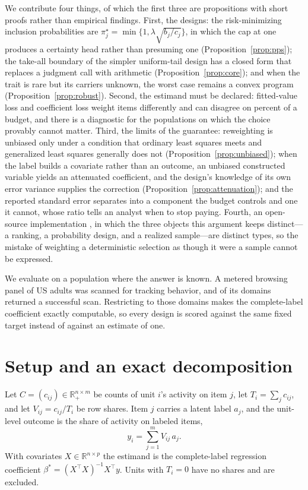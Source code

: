 \documentclass[11pt]{article}
\theoremstyle{plain}
\theoremstyle{remark}
\begin{document}
We contribute four things, of which the first three are propositions with short proofs rather than empirical findings. First, the designs: the risk-minimizing inclusion probabilities are $\pi_j^\star=\min\{1,\lambda\sqrt{b_j/c_j}\}$, in which the cap at one produces a certainty head rather than presuming one (Proposition~\ref{prop:pps}); the take-all boundary of the simpler uniform-tail design has a closed form that replaces a judgment call with arithmetic (Proposition~\ref{prop:core}); and when the trait is rare but its carriers unknown, the worst case remains a convex program (Proposition~\ref{prop:robust}). Second, the estimand must be declared: fitted-value loss and coefficient loss weight items differently and can disagree on \LossDisagreementPct{} percent of a budget, and there is a diagnostic for the populations on which the choice provably cannot matter. Third, the limits of the guarantee: reweighting is unbiased only under a condition that ordinary least squares meets and generalized least squares generally does not (Proposition~\ref{prop:unbiased}); when the label builds a covariate rather than an outcome, an unbiased constructed variable yields an attenuated coefficient, and the design's knowledge of its own error variance supplies the correction (Proposition~\ref{prop:attenuation}); and the reported standard error separates into a component the budget controls and one it cannot, whose ratio tells an analyst when to stop paying. Fourth, an open-source implementation \citep{fewlab}, in which the three objects this argument keeps distinct---a ranking, a probability design, and a realized sample---are distinct types, so the mistake of weighting a deterministic selection as though it were a sample cannot be expressed.

We evaluate on a population where the answer is known. A metered browsing panel of \PanelUsers{} US adults was scanned for tracking behavior, and \LabeledDomains{} of its \PanelDomains{} domains returned a successful scan. Restricting to those domains makes the complete-label coefficient exactly computable, so every design is scored against the same fixed target instead of against an estimate of one.

\section{Setup and an exact decomposition}

Let $C=(c_{ij})\in\mathbb{R}_+^{n\times m}$ be counts of unit $i$'s activity on item $j$, let $T_i=\sum_j c_{ij}$, and let $V_{ij}=c_{ij}/T_i$ be row shares. Item $j$ carries a latent label $a_j$, and the unit-level outcome is the share of activity on labeled items,
\[
y_i=\sum_{j=1}^m V_{ij}\,a_j .
\]
With covariates $X\in\mathbb{R}^{n\times p}$ the estimand is the complete-label regression coefficient $\beta^*=(X^\top X)^{-1}X^\top y$. Units with $T_i=0$ have no shares and are excluded.
\end{document}
